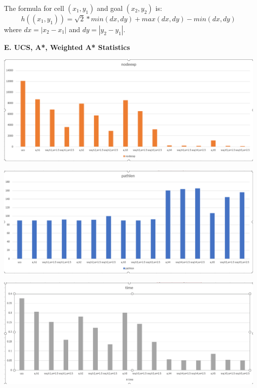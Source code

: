 \documentclass[12pt, letterpaper]{article}
\begin{document}
The formula for cell $(x_1, y_1)$ and goal $(x_2, y_2)$ is:
$$h((x_1,y_1)) = \sqrt{2} * min(dx, dy) + max(dx, dy) - min(dx, dy)$$
where $dx = |x_2 - x_1|$ and $dy = |y_2 - y_1|$. 

\pagebreak %

\noindent \textbf{E. UCS, A*, Weighted A* Statistics}

\noindent \includegraphics[scale=0.5]{"avg-nodeexpanded"}

\medskip

\noindent \includegraphics[scale=0.5]{"avg-pathlength"}

\medskip

\noindent \includegraphics[scale=0.5]{"avg-runtime"}

\medskip

\pagebreak %
\end{document}

